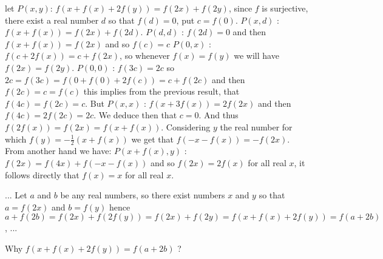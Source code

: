 \begin{solution}
	let $P(x,y)$: $f(x+f(x)+2f(y))=f(2x)+f(2y)$, since $f$ is surjective, there exist a real number $d$ so that $f(d)=0$, put $c=f(0)$.
$P(x,d)$ : $f(x+f(x))=f(2x)+f(2d)$.
$P(d,d)$ : $f(2d)=0$ and then $f(x+f(x))=f(2x)$ and so $f(c)=c$
$P(0,x)$ : $f(c+2f(x))= c + f(2x)$, so whenever $f(x)=f(y)$ we will have $f(2x)=f(2y)$.
$P(0,0)$ : $f(3c)=2c$ so $2c=f(3c)=f(0+f(0)+2f(c))=c+f(2c)$ and then $f(2c)=c=f(c)$
this implies from the previous result, that $f(4c)=f(2c)=c$. But
$P(x,x)$ : $f(x+3f(x))=2f(2x)$ and then $f(4c)=2f(2c)=2c$. We deduce then that $c=0$. And thus $f(2f(x))=f(2x)=f(x+f(x))$. Considering $y$ the real number for which $f(y)=-\frac{1}{2}(x+f(x))$ we get that $f(-x-f(x))=-f(2x)$. From another hand we have:
$P(x+f(x),y)$ : $f(2x)=f(4x)+f(-x-f(x))$ and so $f(2x)=2f(x)$ for all real $x$, it follows directly that $f(x)=x$ for all real $x$.
\end{solution}



\begin{solution}
	\begin{tcolorbox}...
Let $a$ and $b$ be any real numbers, so there exist numbers $x$ and $y$ so that $a=f(2x)$ and $b=f(y)$
hence $a+f(2b)=f(2x)+f(2f(y))=f(2x)+f(2y)=f(x+f(x)+2f(y))=f(a+2b)$, ...\end{tcolorbox}
Why $f\left(x+f(x)+2f(y)\right)=f(a+2b)$ ?
\end{solution}



